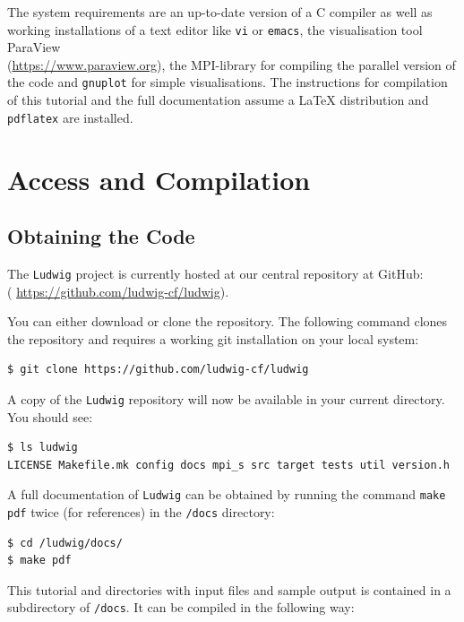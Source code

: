 \documentclass[11pt,twoside,a4paper]{article}
\begin{document}
The system requirements are an up-to-date version of a C compiler as well as working installations 
of a text editor like \texttt{vi} or \texttt{emacs}, the visualisation tool
ParaView \\
({\color{blue}\hyperref[ParaView]{https://www.paraview.org}}), the MPI-library 
for compiling the parallel version of the code and \texttt{gnuplot} for simple visualisations.
The instructions for compilation of this tutorial and the full documentation assume a LaTeX distribution
and \texttt{pdflatex} are installed.

\section{Access and Compilation}

\subsection{Obtaining the Code}
\label{sec:getCode}

The \texttt{Ludwig} project is currently hosted at our central repository at GitHub:\\
({\color{blue} \hyperref[GitHubLudwig]{https://github.com/ludwig-cf/ludwig}}).
\smallskip

You can either download or clone the repository. 
The following command clones the repository and requires a working 
git installation on your local system:

\begin{lstlisting}[style=terminalverbatim]
$ git clone https://github.com/ludwig-cf/ludwig
\end{lstlisting}

A copy of the \texttt{Ludwig} repository will now be available in your current directory. 
You should see:

\begin{lstlisting}
$ ls ludwig
LICENSE Makefile.mk config docs mpi_s src target tests util version.h
\end{lstlisting}

A full documentation of \texttt{Ludwig} can be obtained by running 
the command \texttt{make pdf} twice (for references) in the \texttt{/docs} directory:

\begin{lstlisting}[style=terminalverbatim]
$ cd /ludwig/docs/
$ make pdf
\end{lstlisting}

This tutorial and directories with input files and sample output is contained in 
a subdirectory of \texttt{/docs}. It can be compiled in the following way:
\end{document}
